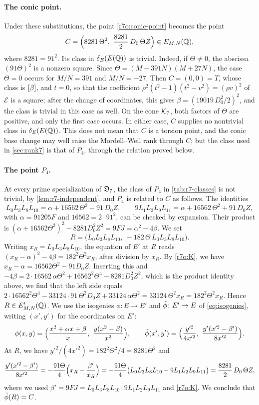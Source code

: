 \paragraph{The conic point.} Under these substitutions, the point
\eqref{r7o:conic-point} becomes the point
\[
 C=\Bigl(8281\,\Theta^2,\ \frac{8281}2\,D_0\,\Theta Z\Bigr)\in E_{M,N}(\Q),
\]
where $8281=91^2$. Its class in $\delta_E(E(\mathbb Q))$ is trivial. Indeed, if
$\Theta\ne0$, the abscissa $(91\Theta)^2$ is a nonzero square. Since
$\Theta=(M-391N)(M+27N)$, the case $\Theta=0$ occurs for $M/N=391$ and
$M/N=-27$. Then $C=(0,0)=T$, whose class is $[\beta]$, and $t=0$, so that
the coefficient $\rho^2(t^2-1)(t^2-v^2)=(\rho v)^2$ of $\mathcal E$ is a
square; after the change of coordinates, this gives
$\beta=(19019\,D_0^2/2)^2$, and the class is trivial in this case as well. On
the cone $\mathcal K_7$, both factors of $\Theta$ are positive, and only the first
case occurs. In either case, $C$ supplies no nontrivial class in $\delta_E(E(\mathbb Q))$.
This does not mean that $C$ is a torsion point, and the conic base change
may well raise the Mordell--Weil rank through $C$; but the class used in
\cref{sec:rank7} is that of $P_4$, through the relation proved below.

\paragraph{The point $P_4$.} At every prime specialization of $\mathfrak D_7$, the
class of $P_4$ in \cref{tab:r7-classes} is not trivial, by
\cref{lem:r7-independent}, and $P_4$ is related to $C$ as follows. The identities
\begin{equation}\label{r7o:K}
 L_0L_3L_8L_{10}=\alpha+16562\,\Theta^2-91\,D_0Z,\qquad
 9L_1L_2L_9L_{11}=\alpha+16562\,\Theta^2+91\,D_0Z,
\end{equation}
with $\alpha=91205F$ and $16562=2\cdot91^2$, can be checked by expansion.
Their product is
$(\alpha+16562\Theta^2)^2-8281D_0^2Z^2=9FJ=\alpha^2-4\beta$. We set
\[
 R=\bigl(L_0L_3L_8L_{10},\ -182\,\Theta\,L_0L_3L_8L_{10}\bigr).
\]
Writing $x_R=L_0L_3L_8L_{10}$, the equation of $E'$ at $R$ reads
$(x_R-\alpha)^2-4\beta=182^2\Theta^2x_R$, after division by $x_R$. By
\eqref{r7o:K}, we have $x_R-\alpha=16562\Theta^2-91D_0Z$. Inserting this and
$-4\beta=2\cdot16562\,\alpha\Theta^2+16562^2\Theta^4-8281D_0^2Z^2$, which is
the product identity above, we find that the left side equals
$2\cdot16562^2\Theta^4-33124\cdot91\,\Theta^2D_0Z+33124\,\alpha\Theta^2
=33124\,\Theta^2x_R=182^2\Theta^2x_R$. Hence $R\in E'_{M,N}(\mathbb Q)$. We use the isogenies
$\phi\colon E\to E'$ and $\hat\phi\colon E'\to E$ of \eqref{eq:isogenies},
writing $(x',y')$ for the coordinates on $E'$:
\[
 \phi(x,y)=\Bigl(\frac{x^2+\alpha x+\beta}x,\ \frac{y(x^2-\beta)}{x^2}\Bigr),
 \qquad
 \dual(x',y')=\Bigl(\frac{y'^2}{4x'^2},\ \frac{y'(x'^2-\beta')}{8x'^2}\Bigr).
\]
At $R$, we have $y'^2/(4x'^2)=182^2\Theta^2/4=8281\Theta^2$ and
\[
 \frac{y'(x'^2-\beta')}{8x'^2}=-\frac{91\Theta}4\Bigl(x_R-\frac{\beta'}{x_R}\Bigr)
 =-\frac{91\Theta}4\bigl(L_0L_3L_8L_{10}-9L_1L_2L_9L_{11}\bigr)
 =\frac{8281}2\,D_0\,\Theta Z,
\]
where we used $\beta'=9FJ=L_0L_3L_8L_{10}\cdot9L_1L_2L_9L_{11}$ and
\eqref{r7o:K}. We conclude that $\hat\phi(R)=C$.

